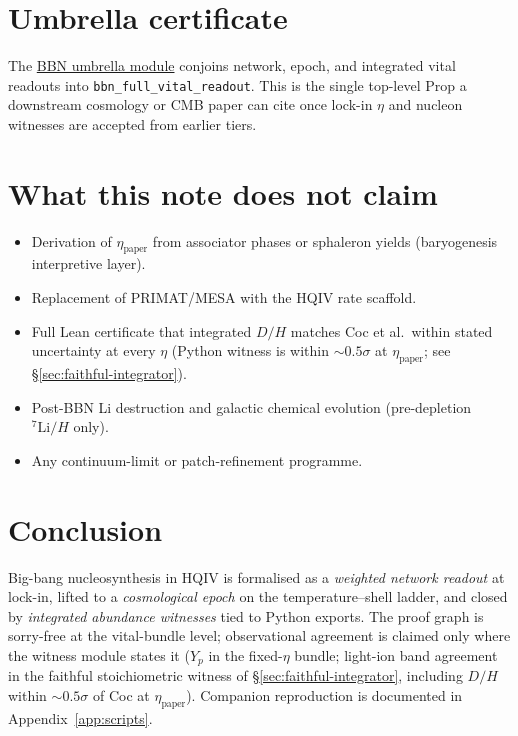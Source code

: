 \documentclass[11pt]{amsart}
\newcommand{\etap}{\ensuremath{\eta_{\mathrm{paper}}}}
\begin{document}
\section{Umbrella certificate}
\label{sec:umbrella}

The \hyperref[lean:bbn-umbrella]{BBN umbrella module} conjoins network,
epoch, and integrated vital readouts into
\texttt{bbn\_full\_vital\_readout}. This is the single top-level Prop a
downstream cosmology or CMB paper can cite once lock-in $\eta$ and nucleon
witnesses are accepted from earlier tiers.

\section{What this note does not claim}
\label{sec:not-claimed}

\begin{itemize}[leftmargin=2em]
\item Derivation of $\eta_{\mathrm{paper}}$ from associator phases or
  sphaleron yields (baryogenesis interpretive layer).
\item Replacement of PRIMAT/MESA with the HQIV rate scaffold.
\item Full Lean certificate that integrated $D/H$ matches Coc et al.\ within
  stated uncertainty at every $\eta$ (Python witness is within $\sim 0.5\sigma$
  at $\eta_{\mathrm{paper}}$; see \S\ref{sec:faithful-integrator}).
\item Post-BBN Li destruction and galactic chemical evolution (pre-depletion
  $^7\mathrm{Li}/H$ only).
\item Any continuum-limit or patch-refinement programme.
\end{itemize}

\section{Conclusion}

Big-bang nucleosynthesis in HQIV is formalised as a \emph{weighted network
readout} at lock-in, lifted to a \emph{cosmological epoch} on the
temperature--shell ladder, and closed by \emph{integrated abundance witnesses}
tied to Python exports. The proof graph is sorry-free at the vital-bundle
level; observational agreement is claimed only where the witness module
states it ($Y_p$ in the fixed-$\eta$ bundle; light-ion band agreement in the
faithful stoichiometric witness of \S\ref{sec:faithful-integrator}, including
$D/H$ within $\sim 0.5\sigma$ of Coc at \etap{}). Companion reproduction is documented in
Appendix~\ref{app:scripts}.
\end{document}
